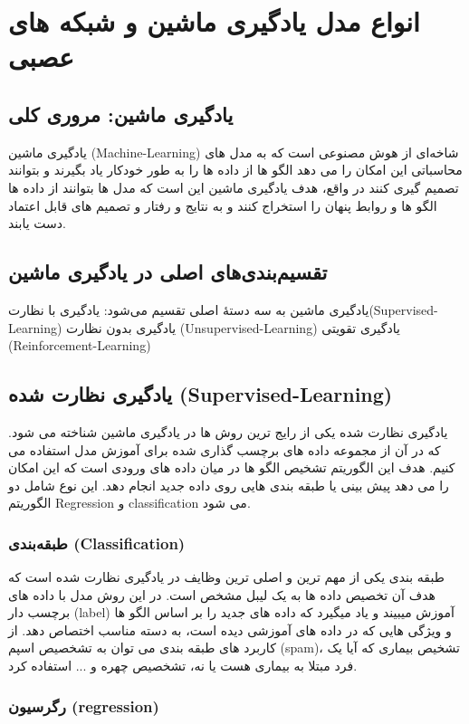 \section{انواع مدل یادگیری ماشین و شبکه های عصبی}

\subsection{یادگیری ماشین: مروری کلی}

یادگیری ماشین (Machine-Learning) شاخه‌ای از هوش مصنوعی است که به مدل های محاسباتی این امکان را می دهد الگو ها  از داده ها را به طور خودکار یاد بگیرند و بتوانند تصمیم گیری کنند در واقع، هدف یادگیری ماشین این است که مدل ها بتوانند  از داده ها الگو ها و روابط پنهان را استخراج کنند و به نتایج و رفتار و تصمیم های قابل اعتماد دست یابند.
\subsection{تقسیم‌بندی‌های اصلی در یادگیری ماشین}

یادگیری ماشین به سه دستهٔ اصلی تقسیم می‌شود:
یادگیری با نظارت(Supervised-Learning)
یادگیری بدون نظارت (Unsupervised-Learning)
یادگیری تقویتی (Reinforcement-Learning)

\subsection{یادگیری نظارت شده (Supervised-Learning)}
یادگیری نظارت شده یکی از رایج ترین روش ها در یادگیری ماشین شناخته می شود. که در آن از مجموعه داده های برچسب گذاری شده برای آموزش مدل استفاده می کنیم.
هدف این الگوریتم تشخیص الگو ها در میان داده های ورودی است که این امکان را می دهد  پیش بینی یا طبقه بندی هایی روی داده جدید انجام دهد.
این نوع شامل دو الگوریتم Regression  و classification  می شود.

\subsubsection{طبقه‌بندی (Classification)}

طبقه بندی یکی از مهم ترین و اصلی ترین وظایف در یادگیری نظارت شده است که هدف آن تخصیص داده ها به یک لیبل مشخص است. در این روش مدل با داده های برچسب دار (label) آموزش میبیند و یاد میگیرد که داده های جدید را بر اساس الگو ها و ویژگی هایی که در داده های آموزشی دیده است، به دسته مناسب اختصاص دهد. از کاربرد های طبقه بندی می توان به تشخصیص اسپم (spam)، تشخیص بیماری که آیا یک فرد مبتلا به بیماری هست یا نه، تشخصیص چهره و ...  استفاده کرد.
\subsubsection{رگرسیون (regression)}

